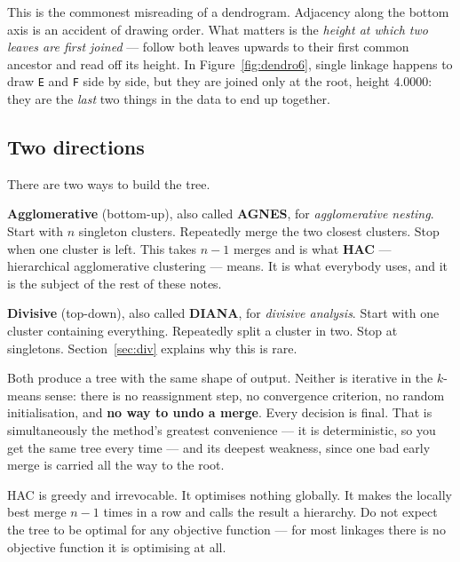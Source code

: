 \documentclass[11pt]{article}
\begin{document}
\begin{caution}
This is the commonest misreading of a dendrogram. Adjacency along the bottom
axis is an accident of drawing order. What matters is the \emph{height at
which two leaves are first joined} --- follow both leaves upwards to their
first common ancestor and read off its height. In
Figure~\ref{fig:dendro6}, single linkage happens to draw \texttt{E} and
\texttt{F} side by side, but they are joined only at the root, height
$4.0000$: they are the \emph{last} two things in the data to end up together.
\end{caution}

\subsection{Two directions}

There are two ways to build the tree.

\textbf{Agglomerative} (bottom-up), also called \textbf{AGNES}, for
\emph{agglomerative nesting}. Start with $n$ singleton clusters. Repeatedly
merge the two closest clusters. Stop when one cluster is left. This takes
$n-1$ merges and is what \textbf{HAC} --- hierarchical agglomerative
clustering --- means. It is what everybody uses, and it is the subject of the
rest of these notes.

\textbf{Divisive} (top-down), also called \textbf{DIANA}, for \emph{divisive
analysis}. Start with one cluster containing everything. Repeatedly split a
cluster in two. Stop at singletons. Section~\ref{sec:div} explains why this is
rare.

Both produce a tree with the same shape of output. Neither is iterative in the
$k$-means sense: there is no reassignment step, no convergence criterion, no
random initialisation, and \textbf{no way to undo a merge}. Every decision is
final. That is simultaneously the method's greatest convenience --- it is
deterministic, so you get the same tree every time --- and its deepest
weakness, since one bad early merge is carried all the way to the root.

\begin{keyidea}
HAC is greedy and irrevocable. It optimises nothing globally. It makes the
locally best merge $n-1$ times in a row and calls the result a hierarchy. Do
not expect the tree to be optimal for any objective function --- for most
linkages there is no objective function it is optimising at all.
\end{keyidea}
\end{document}
